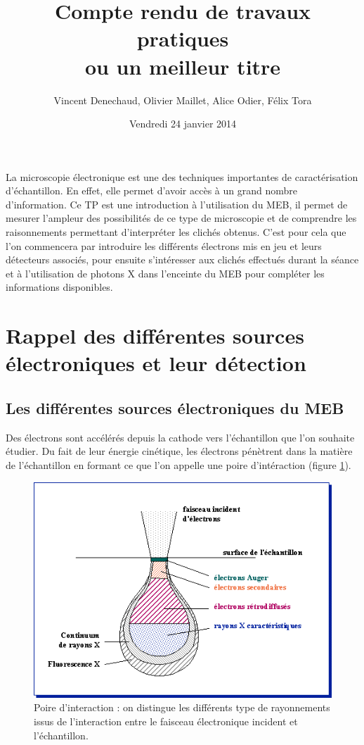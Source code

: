 \documentclass[a4paper,12pt]{article}
\title{Compte rendu de travaux pratiques\\ \small ou un meilleur titre}
\author{Vincent Denechaud, Olivier Maillet, Alice Odier, Félix Tora}
\date{Vendredi 24 janvier 2014}
\begin{document}
\maketitle

La microscopie électronique est une des techniques importantes de caractérisation d'échantillon. En effet, elle permet d'avoir accès à un grand nombre d'information. Ce TP est une introduction à l'utilisation du MEB, il permet de mesurer l'ampleur des possibilités de ce type de microscopie et de comprendre les raisonnements permettant d'interpréter les clichés obtenus. C'est pour cela que l'on commencera par introduire les différents électrons mis en jeu et leurs détecteurs associés, pour ensuite s'intéresser aux clichés effectués durant la séance et à l'utilisation de photons X dans l'enceinte du MEB pour compléter les informations disponibles.


\section{Rappel des différentes sources électroniques et leur détection}


\subsection{Les différentes sources électroniques du MEB}

Des électrons sont accélérés depuis la cathode vers l'échantillon que l'on souhaite étudier. Du fait de leur énergie cinétique, les électrons pénètrent dans la matière de l'échantillon en formant ce que l'on appelle une poire d'intéraction (figure \ref{fig:poire_int}).

\begin{figure}
\centering
\includegraphics[width = 0.8 \textwidth]{images/poire_int.png}
\caption{Poire d'interaction : on distingue les différents type de rayonnements issus de l'interaction entre le faisceau électronique incident et l'échantillon.}
\label{fig:poire_int}
\end{figure}
\end{document}
